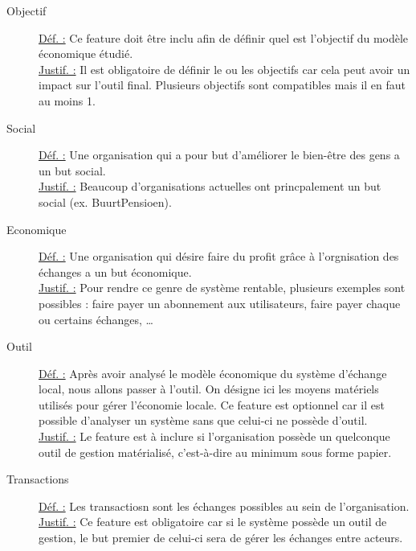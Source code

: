 \begin{description}
\begin{center}
\end{center}

\item [Objectif]
\underline{Déf. :}  Ce feature doit être inclu afin de définir quel est l'objectif du modèle économique étudié.
\\ \underline{Justif. :}  Il est obligatoire de définir le ou les objectifs car cela peut avoir un impact sur l'outil final.  Plusieurs objectifs sont compatibles mais il en faut au moins 1.
\newline

\item [Social]
\underline{Déf. :}  Une organisation qui a pour but d'améliorer le bien-être des gens a un but social.
\\ \underline{Justif. :}  Beaucoup d'organisations actuelles ont princpalement un but social (ex. BuurtPensioen).
\newline

\item [Economique]
\underline{Déf. :}  Une organisation qui désire faire du profit grâce à l'orgnisation des échanges a un but économique.
\\ \underline{Justif. :}  Pour rendre ce genre de système rentable,  plusieurs exemples sont possibles : faire payer un abonnement aux utilisateurs,  faire payer chaque ou certains échanges, \dots
\newline

\item [Outil]
\underline{Déf. :}  Après avoir analysé le modèle économique du système d'échange local,  nous allons passer à l'outil.  On désigne ici les moyens matériels utilisés pour gérer l'économie locale.  Ce feature est optionnel car il est possible d'analyser un système sans que celui-ci ne possède d'outil.  
\\ \underline{Justif. :}  Le feature est à inclure si l'organisation possède un quelconque outil de gestion matérialisé,  c'est-à-dire au minimum sous forme papier.
\newline

\begin{center}
\end{center}

\item [Transactions]
\underline{Déf. :}  Les transactiosn sont les échanges possibles au sein de l'organisation.
\\ \underline{Justif. :}  Ce feature est obligatoire car si le système possède un outil de gestion,  le but premier de celui-ci sera de gérer les échanges entre acteurs.
\newline


\end{description}
